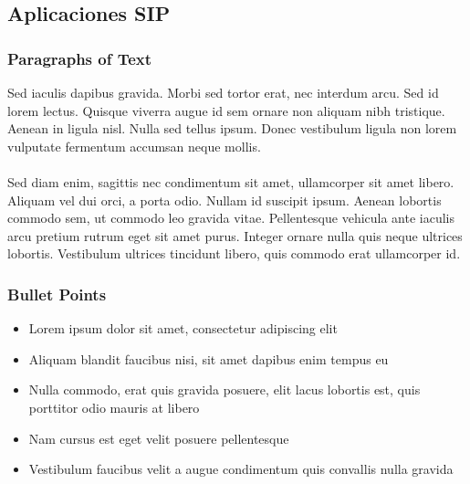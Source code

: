 \documentclass{beamer}
\begin{document}
\subsection{Aplicaciones SIP}
\begin{frame}
\frametitle{Paragraphs of Text}
Sed iaculis dapibus gravida. Morbi sed tortor erat, nec interdum arcu. Sed id lorem lectus. Quisque viverra augue id sem ornare non aliquam nibh tristique. Aenean in ligula nisl. Nulla sed tellus ipsum. Donec vestibulum ligula non lorem vulputate fermentum accumsan neque mollis.\\~\\

Sed diam enim, sagittis nec condimentum sit amet, ullamcorper sit amet libero. Aliquam vel dui orci, a porta odio. Nullam id suscipit ipsum. Aenean lobortis commodo sem, ut commodo leo gravida vitae. Pellentesque vehicula ante iaculis arcu pretium rutrum eget sit amet purus. Integer ornare nulla quis neque ultrices lobortis. Vestibulum ultrices tincidunt libero, quis commodo erat ullamcorper id.
\end{frame}


\begin{frame}
\frametitle{Bullet Points}
\begin{itemize}
\item Lorem ipsum dolor sit amet, consectetur adipiscing elit
\item Aliquam blandit faucibus nisi, sit amet dapibus enim tempus eu
\item Nulla commodo, erat quis gravida posuere, elit lacus lobortis est, quis porttitor odio mauris at libero
\item Nam cursus est eget velit posuere pellentesque
\item Vestibulum faucibus velit a augue condimentum quis convallis nulla gravida
\end{itemize}
\end{frame}
\end{document}
